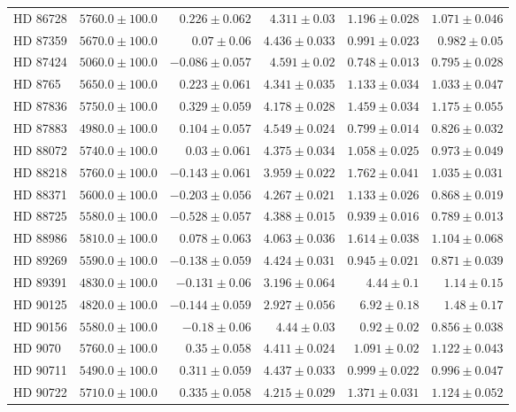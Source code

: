 \begin{longtable*}{lrrrrr}
HD 86728 & $5760.0\pm 100.0$ & $0.226\pm 0.062$ & $4.311\pm 0.03$ & $1.196\pm 0.028$ & $1.071\pm 0.046$ \\ 
HD 87359 & $5670.0\pm 100.0$ & $0.07\pm 0.06$ & $4.436\pm 0.033$ & $0.991\pm 0.023$ & $0.982\pm 0.05$ \\ 
HD 87424 & $5060.0\pm 100.0$ & $-0.086\pm 0.057$ & $4.591\pm 0.02$ & $0.748\pm 0.013$ & $0.795\pm 0.028$ \\ 
HD 8765 & $5650.0\pm 100.0$ & $0.223\pm 0.061$ & $4.341\pm 0.035$ & $1.133\pm 0.034$ & $1.033\pm 0.047$ \\ 
HD 87836 & $5750.0\pm 100.0$ & $0.329\pm 0.059$ & $4.178\pm 0.028$ & $1.459\pm 0.034$ & $1.175\pm 0.055$ \\ 
HD 87883 & $4980.0\pm 100.0$ & $0.104\pm 0.057$ & $4.549\pm 0.024$ & $0.799\pm 0.014$ & $0.826\pm 0.032$ \\ 
HD 88072 & $5740.0\pm 100.0$ & $0.03\pm 0.061$ & $4.375\pm 0.034$ & $1.058\pm 0.025$ & $0.973\pm 0.049$ \\ 
HD 88218 & $5760.0\pm 100.0$ & $-0.143\pm 0.061$ & $3.959\pm 0.022$ & $1.762\pm 0.041$ & $1.035\pm 0.031$ \\ 
HD 88371 & $5600.0\pm 100.0$ & $-0.203\pm 0.056$ & $4.267\pm 0.021$ & $1.133\pm 0.026$ & $0.868\pm 0.019$ \\ 
HD 88725 & $5580.0\pm 100.0$ & $-0.528\pm 0.057$ & $4.388\pm 0.015$ & $0.939\pm 0.016$ & $0.789\pm 0.013$ \\ 
HD 88986 & $5810.0\pm 100.0$ & $0.078\pm 0.063$ & $4.063\pm 0.036$ & $1.614\pm 0.038$ & $1.104\pm 0.068$ \\ 
HD 89269 & $5590.0\pm 100.0$ & $-0.138\pm 0.059$ & $4.424\pm 0.031$ & $0.945\pm 0.021$ & $0.871\pm 0.039$ \\ 
HD 89391 & $4830.0\pm 100.0$ & $-0.131\pm 0.06$ & $3.196\pm 0.064$ & $4.44\pm 0.1$ & $1.14\pm 0.15$ \\ 
HD 90125 & $4820.0\pm 100.0$ & $-0.144\pm 0.059$ & $2.927\pm 0.056$ & $6.92\pm 0.18$ & $1.48\pm 0.17$ \\ 
HD 90156 & $5580.0\pm 100.0$ & $-0.18\pm 0.06$ & $4.44\pm 0.03$ & $0.92\pm 0.02$ & $0.856\pm 0.038$ \\ 
HD 9070 & $5760.0\pm 100.0$ & $0.35\pm 0.058$ & $4.411\pm 0.024$ & $1.091\pm 0.02$ & $1.122\pm 0.043$ \\ 
HD 90711 & $5490.0\pm 100.0$ & $0.311\pm 0.059$ & $4.437\pm 0.033$ & $0.999\pm 0.022$ & $0.996\pm 0.047$ \\ 
HD 90722 & $5710.0\pm 100.0$ & $0.335\pm 0.058$ & $4.215\pm 0.029$ & $1.371\pm 0.031$ & $1.124\pm 0.052$ \\ 

\end{longtable*}
